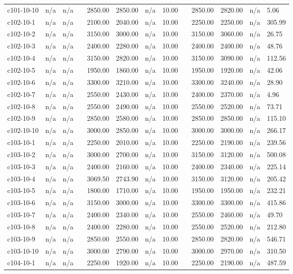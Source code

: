 \documentclass[final,5p,times,twocolumn]{elsarticle}
\begin{document}
{{{{{{{{{{{{{\begin{longtable}{l l l l l l l l l l l l l}
c101-10-10& n/a& n/a&&2850.00& 2850.00& n/a& 10.00&&2850.00& 2820.00& n/a& 5.06\\
c102-10-1& n/a& n/a&&2100.00& 2040.00& n/a& 10.00&&2250.00& 2250.00& n/a& 305.99\\
c102-10-2& n/a& n/a&&3150.00& 3000.00& n/a& 10.00&&3150.00& 3060.00& n/a& 26.75\\
c102-10-3& n/a& n/a&&2400.00& 2280.00& n/a& 10.00&&2400.00& 2400.00& n/a& 48.76\\
c102-10-4& n/a& n/a&&3150.00& 2820.00& n/a& 10.00&&3150.00& 3090.00& n/a& 112.56\\
c102-10-5& n/a& n/a&&1950.00& 1860.00& n/a& 10.00&&1950.00& 1920.00& n/a& 42.06\\
c102-10-6& n/a& n/a&&3300.00& 3210.00& n/a& 10.00&&3300.00& 3240.00& n/a& 28.90\\
c102-10-7& n/a& n/a&&2550.00& 2430.00& n/a& 10.00&&2400.00& 2370.00& n/a& 4.96\\
c102-10-8& n/a& n/a&&2550.00& 2490.00& n/a& 10.00&&2550.00& 2520.00& n/a& 73.71\\
c102-10-9& n/a& n/a&&2850.00& 2580.00& n/a& 10.00&&2850.00& 2850.00& n/a& 115.10\\
c102-10-10& n/a& n/a&&3000.00& 2850.00& n/a& 10.00&&3000.00& 3000.00& n/a& 266.17\\
c103-10-1& n/a& n/a&&2250.00& 2010.00& n/a& 10.00&&2250.00& 2190.00& n/a& 239.56\\
c103-10-2& n/a& n/a&&3000.00& 2700.00& n/a& 10.00&&3150.00& 3120.00& n/a& 500.08\\
c103-10-3& n/a& n/a&&2400.00& 2160.00& n/a& 10.00&&2400.00& 2340.00& n/a& 225.14\\
c103-10-4& n/a& n/a&&3069.50& 2743.90& n/a& 10.00&&3150.00& 3120.00& n/a& 205.42\\
c103-10-5& n/a& n/a&&1800.00& 1710.00& n/a& 10.00&&1950.00& 1950.00& n/a& 232.21\\
c103-10-6& n/a& n/a&&3150.00& 3000.00& n/a& 10.00&&3300.00& 3300.00& n/a& 415.86\\
c103-10-7& n/a& n/a&&2400.00& 2340.00& n/a& 10.00&&2550.00& 2460.00& n/a& 49.70\\
c103-10-8& n/a& n/a&&2400.00& 2280.00& n/a& 10.00&&2550.00& 2520.00& n/a& 212.80\\
c103-10-9& n/a& n/a&&2850.00& 2550.00& n/a& 10.00&&2850.00& 2820.00& n/a& 546.71\\
c103-10-10& n/a& n/a&&3000.00& 2790.00& n/a& 10.00&&3000.00& 2970.00& n/a& 310.50\\
c104-10-1& n/a& n/a&&2250.00& 1920.00& n/a& 10.00&&2250.00& 2190.00& n/a& 487.59\\

\end{longtable}}}}}}}}}}}}}}
\end{document}
